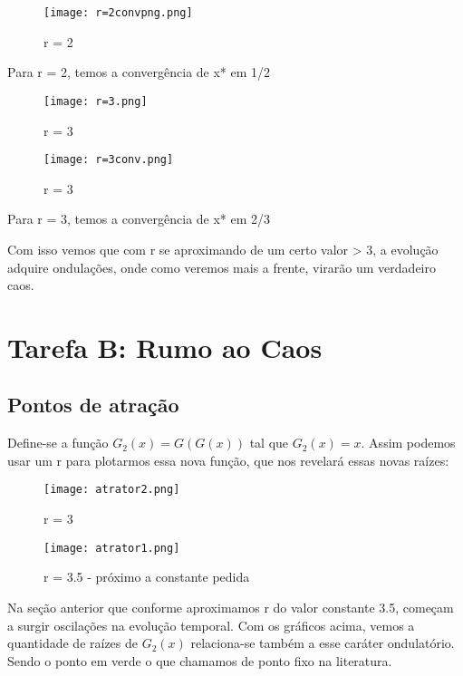 \documentclass[a4paper, 12pt]{article}
\begin{document}
\begin{figure}[H]
    \centering
    \texttt{[image: r=2convpng.png]}
    \caption{r = 2}
\end{figure}

Para r = 2, temos a convergência de x* em 1/2

\begin{figure}[H]
    \centering
    \texttt{[image: r=3.png]}
    \caption{r = 3}
\end{figure}

\begin{figure}[H]
    \centering
    \texttt{[image: r=3conv.png]}
    \caption{r = 3}
\end{figure}

Para r = 3, temos a convergência de x* em 2/3

Com isso vemos que com r se aproximando de um certo valor > 3, a evolução adquire ondulações, onde como veremos mais a frente, virarão um verdadeiro caos.

\section{Tarefa B: Rumo ao Caos}

\subsection{Pontos de atração}

Define-se a função $G_{2}(x) = G(G(x))$ tal que $G_{2}(x) = x$. Assim podemos usar um r para plotarmos essa nova função, que nos revelará essas novas raízes:

\begin{figure}[H]
    \centering
    \texttt{[image: atrator2.png]}
    \caption{r = 3}
\end{figure}

\begin{figure}[H]
    \centering
    \texttt{[image: atrator1.png]}
    \caption{r = 3.5 - próximo a constante pedida}
\end{figure}

Na seção anterior que conforme aproximamos r do valor constante 3.5, começam a surgir oscilações na evolução temporal. Com os gráficos acima, vemos a quantidade de raízes de $G_{2}(x)$ relaciona-se também a esse caráter ondulatório. Sendo o ponto em verde o que chamamos de ponto fixo na literatura.
\end{document}
